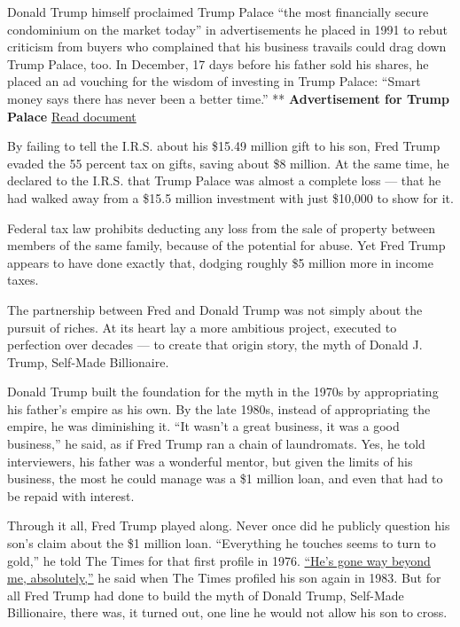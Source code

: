 Donald Trump himself proclaimed Trump Palace ``the most financially
secure condominium on the market today'' in advertisements he placed in
1991 to rebut criticism from buyers who complained that his business
travails could drag down Trump Palace, too. In December, 17 days before
his father sold his shares, he placed an ad vouching for the wisdom of
investing in Trump Palace: ``Smart money says there has never been a
better time.'' ** \textbf{Advertisement for Trump Palace}
\href{https://int.nyt.com/data/documenthelper/128-trump-palace-nyt-ad/fd5972d9e5e9f6edcf53/optimized/full.pdf\#page=1}{Read
document}

By failing to tell the I.R.S. about his \$15.49 million gift to his son,
Fred Trump evaded the 55 percent tax on gifts, saving about \$8 million.
At the same time, he declared to the I.R.S. that Trump Palace was almost
a complete loss --- that he had walked away from a \$15.5 million
investment with just \$10,000 to show for it.

Federal tax law prohibits deducting any loss from the sale of property
between members of the same family, because of the potential for abuse.
Yet Fred Trump appears to have done exactly that, dodging roughly \$5
million more in income taxes.

The partnership between Fred and Donald Trump was not simply about the
pursuit of riches. At its heart lay a more ambitious project, executed
to perfection over decades --- to create that origin story, the myth of
Donald J. Trump, Self-Made Billionaire.

Donald Trump built the foundation for the myth in the 1970s by
appropriating his father's empire as his own. By the late 1980s, instead
of appropriating the empire, he was diminishing it. ``It wasn't a great
business, it was a good business,'' he said, as if Fred Trump ran a
chain of laundromats. Yes, he told interviewers, his father was a
wonderful mentor, but given the limits of his business, the most he
could manage was a \$1 million loan, and even that had to be repaid with
interest.

Through it all, Fred Trump played along. Never once did he publicly
question his son's claim about the \$1 million loan. ``Everything he
touches seems to turn to gold,'' he told The Times for that first
profile in 1976.
\href{https://www.nytimes.com/1983/08/07/business/the-empire-and-ego-of-donald-trump.html}{``He's
gone way beyond me, absolutely,''} he said when The Times profiled his
son again in 1983. But for all Fred Trump had done to build the myth of
Donald Trump, Self-Made Billionaire, there was, it turned out, one line
he would not allow his son to cross.

